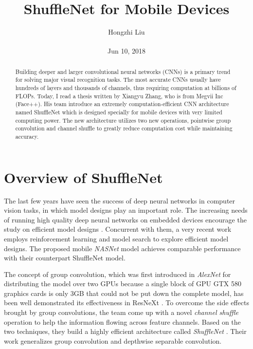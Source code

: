 \documentclass[10pt,twocolumn,letterpaper]{article}
\title{ShuffleNet for Mobile Devices}
\author{Hongzhi Liu\\\\
Jun 10, 2018}
\begin{document}
\maketitle
\begin{abstract}
	Building deeper and larger convolutional neural networks (CNNs) is a primary trend for solving major visual recognition tasks. The most accurate CNNs usually have hundreds of layers and thousands of channels, thus requiring computation at billions of FLOPs. Today, I read a thesis written by Xiangyu Zhang, who is from Megvii Inc (Face++). His team introduce an extremely computation-efficient CNN architecture named ShuffleNet which is designed specially for mobile devices with very limited computing power. The new architecture utilizes two new operations, pointwise group convolution and channel shuffle to greatly reduce computation cost while maintaining accuracy.
\end{abstract}
\section{Overview of ShuffleNet}

The last few years have seen the success of deep neural networks in computer vision tasks, in which model designs play an important role. The increasing needs of running high quality deep neural networks on embedded devices encourage the study on efficient model designs \cite{he2015convolutional}. Concurrent with them, a very recent work \cite{zoph2017learning} employs reinforcement learning and model search to explore efficient model designs. The proposed mobile \emph{NASNet} model achieves comparable performance with their counterpart ShuffleNet model.

The concept of group convolution, which was first introduced in \emph{AlexNet} \cite{krizhevsky2012imagenet} for distributing the model over two GPUs because a single block of GPU GTX 580 graphics cards is only 3GB that could not be put down the complete model, has been well demonstrated its effectiveness in ResNeXt \cite{xie2017aggregated}. To overcome the side effects brought by group convolutions, the team come up with a novel \emph{channel shuffle} operation to help the information flowing across feature channels. Based on the two techniques, they build a highly efficient architecture called \emph{ShuffleNet} \cite{zhang2017shufflenet}. Their work generalizes group convolution and depthwise separable convolution.  
\end{document}
